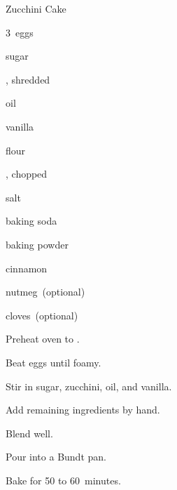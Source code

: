 \begin{recipe}{Zucchini Cake}{}{}

\begin{ingredients}
\item 3~eggs
\item \C{1\half} sugar
\item {} , shredded
\item {} oil
\item {} vanilla
\item {} flour
\item \C{\half} , chopped
\item {} salt
\item {} baking soda
\item {} baking powder
\item {} cinnamon
\item \tp{\half} nutmeg~(optional)
\item \tp{\quarter} cloves~(optional)
\end{ingredients}

\begin{directions}
\item Preheat oven to .
\item Beat eggs until foamy.
\item Stir in sugar, zucchini, oil, and vanilla.
\item Add remaining ingredients by hand.
\item Blend well.
\item Pour into a Bundt pan.
\item Bake for 50 to 60~minutes.
\end{directions}

\end{recipe}
